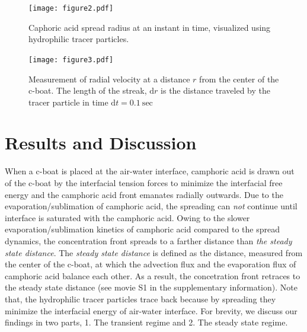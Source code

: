 \documentclass[aps, twocolumn, floatfix, superscriptaddress]{revtex4}
\newcommand{\td}[1]{\mathrm{d}#1}
\begin{document}
\begin{figure}[ht]
\centering
  \texttt{[image: figure2.pdf]}
  \caption{Caphoric acid spread radius at an instant in time, visualized using hydrophilic tracer particles.}
  \label{fig:cspreadimg}
\end{figure}
\begin{figure}[ht]
  \centering
  \texttt{[image: figure3.pdf]}
  \caption{Measurement of radial velocity at a distance $r$ from the center of the c-boat. The length of the streak, $\td{r}$ is the distance traveled by the tracer particle in time $\td{t} = 0.1\ \mathrm{sec}$}
       \label{fig:radvelimg}
\end{figure} 

\section{Results and Discussion}
When a c-boat is placed at the air-water interface, camphoric acid is drawn out of the c-boat by the interfacial tension forces to minimize the interfacial free energy and the camphoric acid front emanates radially outwards. Due to the evaporation/sublimation of camphoric acid, the spreading can \emph{not} continue until interface is saturated with the camphoric acid. Owing to the slower evaporation/sublimation kinetics of camphoric acid compared to the spread dynamics, the concentration front spreads to a farther distance than \emph{the steady state distance}. The \emph{steady state distance} is defined as the distance, measured from the center of the c-boat, at which the advection flux and the evaporation flux of camphoric acid balance each other. As a result, the concetration front retraces to the steady state distance (see movie S1 in the supplementary information). Note that, the hydrophilic tracer particles trace back because by spreading they minimize the interfacial energy of air-water interface. For brevity, we discuss our findings in two parts, 1. The transient regime and 2. The steady state regime. 
\end{document}
